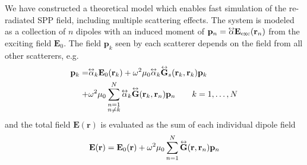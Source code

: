 We have constructed a theoretical model which enables fast simulation of
the re-radiated SPP field, including multiple scattering effects. The
system is modeled as a collection of $n$ dipoles with an induced moment of
$\mathbf{p}_n=\tensor{\alpha} \mathbf{E}_\mathrm{exc}(\mathbf{r}_n)$
from the exciting field $\mathbf{E}_0$. The field $\mathbf{p}_k$ seen by
each scatterer depends on the field from all other scatterers, e.g.
\begin{align}
\mathbf{p}_k =& \tensor{\alpha}_k \mathbf{E}_0(\mathbf{r}_k)
+\omega^2 \mu_0 \tensor{\alpha}_k \tensor{\mathbf{G}}_s(\mathbf{r}_k,\mathbf{r}_k)\mathbf{p}_k\\
+& \omega^2\mu_0 \sum_{\substack{n=1\\n \ne k}}^N
\tensor{\alpha}_k
\tensor{\mathbf{G}}(\mathbf{r}_k,\mathbf{r}_n)\mathbf{p}_n\qquad k=1,\ldots,N
\end{align}
and the total field $\mathbf{E}(\mathbf{r})$ is evaluated as the sum of each individual dipole field
\begin{equation}
\mathbf{E}(\mathbf{r}) = \mathbf{E}_0(\mathbf{r}) + \omega^2 \mu_0
\sum_{n=1}^{N} \tensor{\mathbf{G}}(\mathbf{r},\mathbf{r}_n) \mathbf{p}_n
\end{equation}


